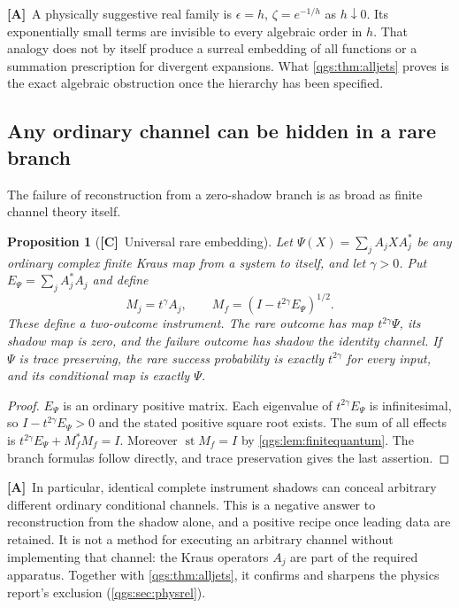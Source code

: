 \documentclass[11pt,oneside]{article}
\numberwithin{equation}{section}
\theoremstyle{plain}
\newtheorem{proposition}[proposition]{Proposition}
\theoremstyle{definition}
\theoremstyle{remark}
\DeclareMathOperator{\st}{st}
\newcommand{\TC}{\textcolor{TierC}{\textsf{\bfseries[C]}}}
\newcommand{\TA}{\textcolor{TierA}{\textsf{\bfseries[A]}}}
\begin{document}
\TA\ A physically suggestive real family is $\epsilon=h$, $\zeta=e^{-1/h}$ as $h\downarrow0$. Its exponentially small terms are invisible to every algebraic order in $h$. That analogy does not by itself produce a surreal embedding of all functions or a summation prescription for divergent expansions. What \cref{qgs:thm:alljets} proves is the exact algebraic obstruction once the hierarchy has been specified.

\subsection{Any ordinary channel can be hidden in a rare branch}
The failure of reconstruction from a zero-shadow branch is as broad as finite channel theory itself.

\begin{proposition}[\TC\ Universal rare embedding]\label{qgs:ops:prop:rare-embedding}
Let $\Psi(X)=\sum_jA_jXA_j^*$ be any ordinary complex finite Kraus map from a system to itself, and let $\gamma>0$. Put $E_\Psi=\sum_jA_j^*A_j$ and define
\begin{equation}\label{qgs:ops:eq:rare-embedding}
 M_j=t^\gamma A_j,\qquad
 M_f=(I-t^{2\gamma}E_\Psi)^{1/2}.
\end{equation}
These define a two-outcome instrument. The rare outcome has map $t^{2\gamma}\Psi$, its shadow map is zero, and the failure outcome has shadow the identity channel. If $\Psi$ is trace preserving, the rare success probability is exactly $t^{2\gamma}$ for every input, and its conditional map is exactly $\Psi$.
\end{proposition}
\begin{proof}
$E_\Psi$ is an ordinary positive matrix. Each eigenvalue of $t^{2\gamma}E_\Psi$ is infinitesimal, so $I-t^{2\gamma}E_\Psi>0$ and the stated positive square root exists. The sum of all effects is $t^{2\gamma}E_\Psi+M_f^*M_f=I$. Moreover $\st M_f=I$ by \cref{qgs:lem:finitequantum}. The branch formulas follow directly, and trace preservation gives the last assertion.
\end{proof}

\TA\ In particular, identical complete instrument shadows can conceal arbitrary different ordinary conditional channels. This is a negative answer to reconstruction from the shadow alone, and a positive recipe once leading data are retained. It is not a method for executing an arbitrary channel without implementing that channel: the Kraus operators $A_j$ are part of the required apparatus. Together with \cref{qgs:thm:alljets}, it confirms and sharpens the physics report's exclusion (\cref{qgs:sec:physrel}).
\end{document}
